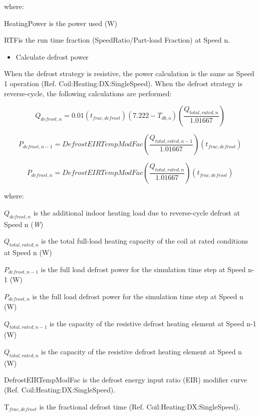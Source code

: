 where:

HeatingPower is the power used (W)

RTFis the run time fraction (SpeedRatio/Part-load Fraction) at Speed n.

\begin{itemize}
  \item Calculate defrost power
\end{itemize}

When the defrost strategy is resistive, the power calculation is the same as Speed 1 operation (Ref. Coil:Heating:DX:SingleSpeed). When the defrost strategy is reverse-cycle, the following calculations are performed:

\begin{equation}
{Q_{defrost,n}} = 0.01({t_{frac,defrost}})(7.222 - {T_{db,o}})\left( {\frac{{{Q_{total,rated,n}}}}{{1.01667}}} \right)
\end{equation}

\begin{equation}
{P_{defrost,n - 1}} = DefrostEIRTempModFac\left( {\frac{{{Q_{total,rated,n - 1}}}}{{1.01667}}} \right)({t_{frac,defrost}})
\end{equation}

\begin{equation}
{P_{defrost,n}} = DefrostEIRTempModFac\left( {\frac{{{Q_{total,rated,n}}}}{{1.01667}}} \right)({t_{frac,defrost}})
\end{equation}

where:

\({Q_{defrost,n}}\) is the additional indoor heating load due to reverse-cycle defrost at Speed n (\emph{W})

\({Q_{total,rated,n}}\) is the total full-load heating capacity of the coil at rated conditions at Speed n (W)

\({P_{defrost,n - 1}}\) is the full load defrost power for the simulation time step at Speed n-1 (W)

\({P_{defrost,n}}\) is the full load defrost power for the simulation time step at Speed n (W)

\({Q_{total,rated,n - 1}}\) is the capacity of the resistive defrost heating element at Speed n-1 (W)

\({Q_{total,rated,n}}\) is the capacity of the resistive defrost heating element at Speed n (W)

DefrostEIRTempModFac is the defrost energy input ratio (EIR) modifier curve (Ref. Coil:Heating:DX:SingleSpeed).

T\(_{frac,defrost}\) is the fractional defrost time (Ref. Coil:Heating:DX:SingleSpeed).

